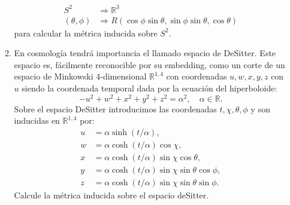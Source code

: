 \documentclass[../main]{subfiles}
\begin{document}
\begin{enumerate}
\begin{enumerate}[label=(\alph*)]
        \begin{equation}
            \begin{split}
                S^2 & \Rightarrow \mathbb{R}^3 \\
                (\theta, \phi) & \Rightarrow R(\cos\phi \sin\theta, \sin\phi \sin\theta, \cos\theta)
            \end{split}
        \end{equation}
        para calcular la métrica inducida sobre $S^2$.
        \item En cosmología tendrá importancia el llamado espacio de DeSitter. Este espacio es, fácilmente reconocible por su embedding, como un corte de un espacio de Minkowski 4-dimensional $\mathbb{R}^{1, 4}$ con coordenadas $u, w, x, y, z$ con $u$ siendo la coordenada temporal dada por la ecuación del hiperboloide:
        \begin{equation}
            -u^2+w^2+x^2+y^2+z^2=\alpha^2, \quad \alpha \in \mathbb{R}.
        \end{equation}
        Sobre el espacio DeSitter introducimos las coordenadas $t, \chi, \theta, \phi$ y son inducidas en $\mathbb{R}^{1, 4}$ por:
        \begin{equation}
            \begin{split}
                u&=\alpha \sinh(t/\alpha), \\
                w&=\alpha \cosh(t/\alpha)\cos \chi,\\
                x&=\alpha \cosh(t/\alpha)\sin \chi \cos \theta,\\
                y&=\alpha \cosh(t/\alpha)\sin \chi \sin \theta \cos \phi,\\
                z&=\alpha \cosh(t/\alpha)\sin \chi \sin \theta \sin \phi.
            \end{split}
        \end{equation}
        Calcule la métrica inducida sobre el espacio deSitter.
    \end{enumerate}
\end{enumerate}
\end{document}
